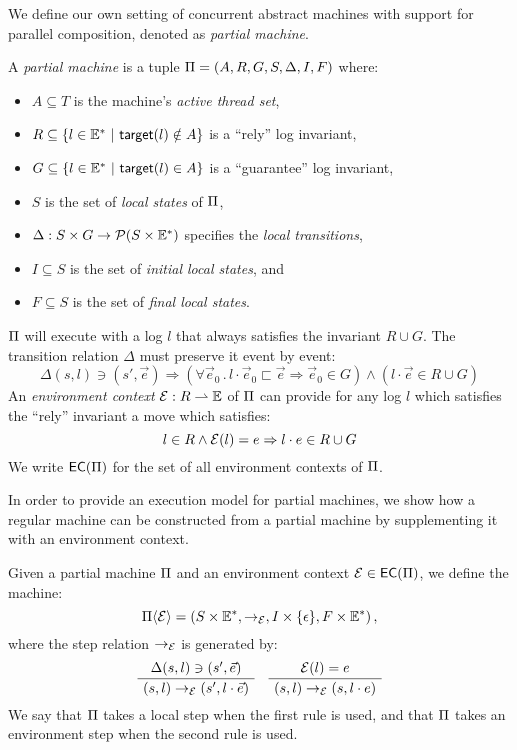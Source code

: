 We define our own setting of concurrent abstract machines
with support for parallel composition,
denoted as \emph{partial machine}.
\begin{definition}
\label{def:partialm}
A \emph{partial machine} is a tuple $\Pi = (A, R, G, S, \Delta, I, F)$
where:
\begin{itemize}
\item
$A \subseteq T$ is the machine's \emph{active thread set},
\item
$R \subseteq \{ l \in \Ev^* \ |\ \kw{target}(l) \notin A \}$ is a ``rely'' log invariant,
\item
$G \subseteq \{ l \in \Ev^* \ |\ \kw{target}(l) \in A \}$ is a ``guarantee'' log invariant,
\item
$S$ is the set of \emph{local states} of $\Pi$,
\item
$\Delta : S \times G \rightarrow \mathcal{P}(S \times \mathbb{E}^*)$
specifies the \emph{local transitions},
\item
$I \subseteq S$ is the set of \emph{initial local states}, and
\item
$F \subseteq S$ is the set of \emph{final local states}.
\end{itemize}
$\Pi$ will execute with a log $l$ that always satisfies the invariant $R \cup G$.
The transition relation $\Delta$ must preserve it event by event:
\[ \Delta(s, l) \ni (s', \vec{e}) \Rightarrow (\forall \vec{e}_0 \,.\, l \cdot \vec{e}_0 \sqsubset \vec{e} \Rightarrow \vec{e}_0 \in G) \wedge (l \cdot \vec{e} \in R \cup G) \]
An \emph{environment context} $\mathcal{E} : R \rightharpoonup \mathbb{E}$
of $\Pi$ can provide for any log $l$
which satisfies the ``rely'' invariant
a move which satisfies:
\[ l \in R \land \mathcal{E}(l) = e \Rightarrow l \cdot e \in R \cup G \]
We write ${{\mathsf{EC}}({\Pi})}$ for the set of all environment contexts of $\Pi$.
\end{definition}

In order to provide an execution model for partial machines,
we show how a regular machine can be constructed
from a partial machine
by supplementing it with an environment context.

\begin{definition}
Given a partial machine $\Pi$ and an environment context $\mathcal{E} \in {{\mathsf{EC}}({\Pi})}$,
we define the machine:
\[ \Pi \langle \mathcal{E} \rangle =
	(S \times \mathbb{E}^*, \rightarrow_{\mathcal{E}}, I \times \{\epsilon\}, F \times \mathbb{E}^*) \,, \]
where the step relation $\rightarrow_{\mathcal{E}}$ is generated by:
\[
	\AxiomC{$\Delta(s, l) \ni (s', \vec{e})$}
	\UnaryInfC{$(s, l) \rightarrow_\Env (s', l \cdot \vec{e})$}
	\DisplayProof
	\quad
	\AxiomC{$\Env(l) = e$}
	\UnaryInfC{$(s, l) \rightarrow_\Env (s, l \cdot e)$}
	\DisplayProof
\]
We say that $\Pi$ takes a local step when the first rule is used,
and that $\Pi$ takes an environment step when the second rule is used.
\end{definition}

